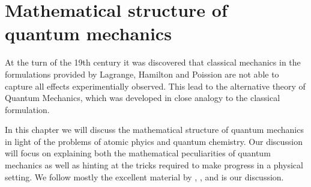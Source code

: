 \chapter{Mathematical structure of quantum mechanics}

At the turn of the 19th century it was discovered
that classical mechanics in the formulations provided
by Lagrange, Hamilton and Poission
are not able to capture all effects experimentially observed.
This lead to the alternative theory of Quantum Mechanics,
which was developed in close analogy to the classical formulation.

In this chapter we will discuss the mathematical structure
of quantum mechanics in light of the problems of atomic phyics
and quantum chemistry.
Our discussion will focus on explaining both the mathematical
peculiarities of quantum mechanics as well as hinting
at the tricks required to make progress in a physical setting.
We follow mostly the excellent material by \citet{Shankar1994},
\citet{Mueller2000}, \citet{Davies2007} and \citet{Helffer2013} is our discussion.





